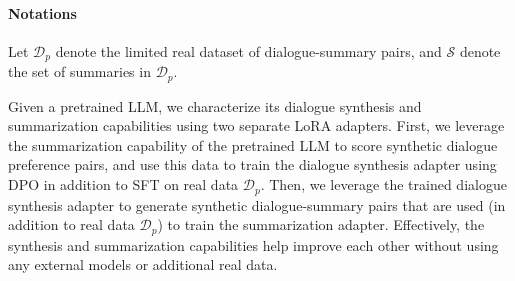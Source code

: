 \paragraph{Notations} Let $\mathcal{D}_p$ denote the limited real dataset of dialogue-summary pairs, and $\mathcal{S}$ denote the set of summaries in $\mathcal{D}_p$.

Given a pretrained LLM, we characterize its dialogue synthesis and summarization capabilities using two separate LoRA \citep{hu2022lora} adapters. 
First, we leverage the summarization capability of the pretrained LLM to score synthetic dialogue preference pairs, and use this data to train the dialogue synthesis adapter using DPO in addition to SFT on real data $\mathcal{D}_p$. Then, we leverage the trained dialogue synthesis adapter to generate synthetic dialogue-summary pairs that are used (in addition to real data $\mathcal{D}_p$) to train the summarization adapter.
Effectively, the synthesis and summarization capabilities help improve each other without using any external models or additional real data.




 
